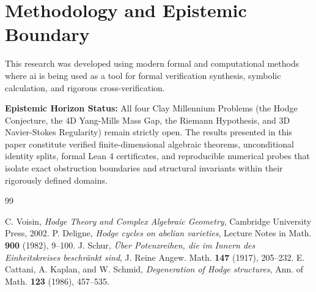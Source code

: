 \documentclass[11pt,a4paper]{article}
\theoremstyle{definition}
\begin{document}
\section{Methodology and Epistemic Boundary}
\noindent This research was developed using modern formal and computational methods where ai is being used as a tool for formal verification synthesis, symbolic calculation, and rigorous cross-verification.

\vspace{0.5em}
\noindent\textbf{Epistemic Horizon Status:} All four Clay Millennium Problems (the Hodge Conjecture, the 4D Yang-Mills Mass Gap, the Riemann Hypothesis, and 3D Navier-Stokes Regularity) remain strictly open. The results presented in this paper constitute verified finite-dimensional algebraic theorems, unconditional identity splits, formal Lean 4 certificates, and reproducible numerical probes that isolate exact obstruction boundaries and structural invariants within their rigorously defined domains.

\begin{thebibliography}{99}

 C. Voisin, \emph{Hodge Theory and Complex Algebraic Geometry}, Cambridge University Press, 2002.
 P. Deligne, \emph{Hodge cycles on abelian varieties}, Lecture Notes in Math. \textbf{900} (1982), 9--100.
 J. Schur, \emph{\"Uber Potenzreihen, die im Innern des Einheitskreises beschr\"ankt sind}, J. Reine Angew. Math. \textbf{147} (1917), 205--232.
 E. Cattani, A. Kaplan, and W. Schmid, \emph{Degeneration of Hodge structures}, Ann. of Math. \textbf{123} (1986), 457--535.

\end{thebibliography}
\end{document}
